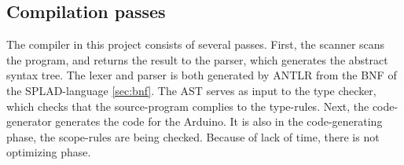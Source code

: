 \subsection{Compilation passes}
The compiler in this project consists of several passes. First, the scanner scans the program, and returns the result to the parser, which generates the abstract syntax tree. The lexer and parser is both generated by ANTLR \citep{ANTLR} from the BNF of the SPLAD-language \ref{sec:bnf}. The AST serves as input to the type checker, which checks that the source-program complies to the type-rules. Next, the code-generator generates the code for the Arduino. It is also in the code-generating phase, the scope-rules are being checked. Because of lack of time, there is not optimizing phase. 
